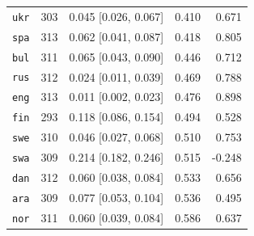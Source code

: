 \begin{table}[htbp]
\begin{minipage}[t]{0.485\linewidth}
{\begin{tabular}{@{}lrrrr@{}}
\texttt{ukr} & 303 & 0.045 [0.026, 0.067] & 0.410 & 0.671 \\
\texttt{spa} & 313 & 0.062 [0.041, 0.087] & 0.418 & 0.805 \\
\texttt{bul} & 311 & 0.065 [0.043, 0.090] & 0.446 & 0.712 \\
\texttt{rus} & 312 & 0.024 [0.011, 0.039] & 0.469 & 0.788 \\
\texttt{eng} & 313 & 0.011 [0.002, 0.023] & 0.476 & 0.898 \\
\texttt{fin} & 293 & 0.118 [0.086, 0.154] & 0.494 & 0.528 \\
\texttt{swe} & 310 & 0.046 [0.027, 0.068] & 0.510 & 0.753 \\
\texttt{swa} & 309 & 0.214 [0.182, 0.246] & 0.515 & -0.248 \\
\texttt{dan} & 312 & 0.060 [0.038, 0.084] & 0.533 & 0.656 \\
\texttt{ara} & 309 & 0.077 [0.053, 0.104] & 0.536 & 0.495 \\
\texttt{nor} & 311 & 0.060 [0.039, 0.084] & 0.586 & 0.637 \\
\bottomrule
\end{tabular}}
\end{minipage}
\end{table}

